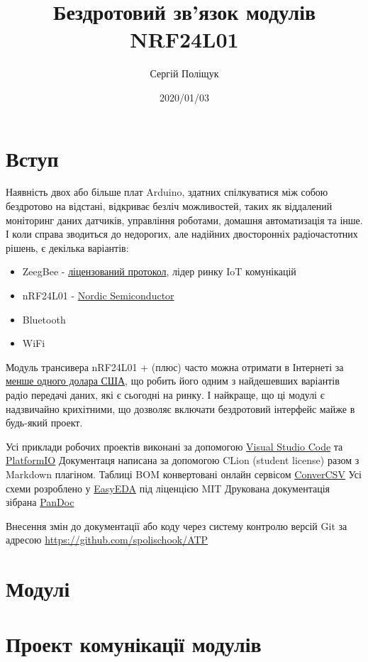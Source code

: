 \documentclass[14pt,a4paper]{extarticle}
\title{Бездротовий зв'язок модулів NRF24L01}
\author{Сергій Поліщук}
\date{2020/01/03}
\begin{document}
\maketitle
\tableofcontents
\clearpage
\section{Вступ}
Наявність двох або більше плат Arduino, здатних спілкуватися між собою
бездротово на відстані, відкриває безліч можливостей, таких як
віддалений моніторинг даних датчиків, управління роботами, домашня
автоматизація та інше. І коли справа зводиться до недорогих, але
надійних двосторонніх радіочастотних рішень, є декілька варіантів:
\begin{itemize}
\item ZeegBee -
\href{https://web.archive.org/web/20100216234546/http://freaklabs.org/index.php/Blog/Zigbee/Zigbee-Linux-and-the-GPL.html}{ліцензований
протокол}, лідер ринку IoT комунікацій
\item nRF24L01 -
\href{https://www.nordicsemi.com/Products/Low-power-short-range-wireless/nRF24-series}{Nordic
Semiconductor}
\item Bluetooth
\item WiFi
\end{itemize}

Модуль трансивера nRF24L01 + (плюс) часто можна отримати в Інтернеті за
\href{https://ru.aliexpress.com/wholesale?SearchText=nrf24l01}{менше
одного долара США}, що робить його одним з найдешевших варіантів радіо
передачі даних, які є сьогодні на ринку. І найкраще, що ці модулі є
надзвичайно крихітними, що дозволяє включати бездротовий інтерфейс майже
в будь-який проект.

Усі приклади робочих проектів виконані за допомогою
\href{https://code.visualstudio.com/}{Visual Studio Code}
та \href{https://platformio.org/}{PlatformIO}  
Документаця написана за допомогою CLion (student license)
разом з Markdown плагіном.  
Таблиці BOM конвертовані онлайн сервісом \href{https://www.convertcsv.com/csv-to-markdown.htm}{ConverCSV}  
Усі схеми розроблено у \href{https://easyeda.com/}{EasyEDA} під ліценцією MIT  
Друкована документація зібрана \href{https://pandoc.org/}{PanDoc}

Внесення змін до документації або коду через систему контролю
версій Git за адресою
\href{https://github.com/spolischook/ATP}{https://github.com/spolischook/ATP}


\clearpage


\clearpage
\section{Модулі}


\clearpage

\clearpage

\clearpage

\clearpage
\section{Проект комунікації модулів}
\end{document}

